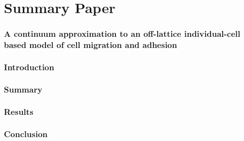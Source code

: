 \documentclass[12pt,letterpaper,cm]{article}
\renewcommand{\.}{\cdot}
\newcommand{\<}{\langle}
\renewcommand{\>}{\rangle}
\begin{document}
	
	
	
	\part*{Summary Paper}
	\section*{A continuum approximation to an off-lattice individual-cell based model of cell migration and adhesion \cite{Middleton2014} }
	
	
	
	\section*{Introduction}
	
	
	
	\section*{Summary}
	
	
	
	\section*{Results}	
	
	
	
	\section*{Conclusion}
	
	\printbibliography
	
	
	
\end{document}
